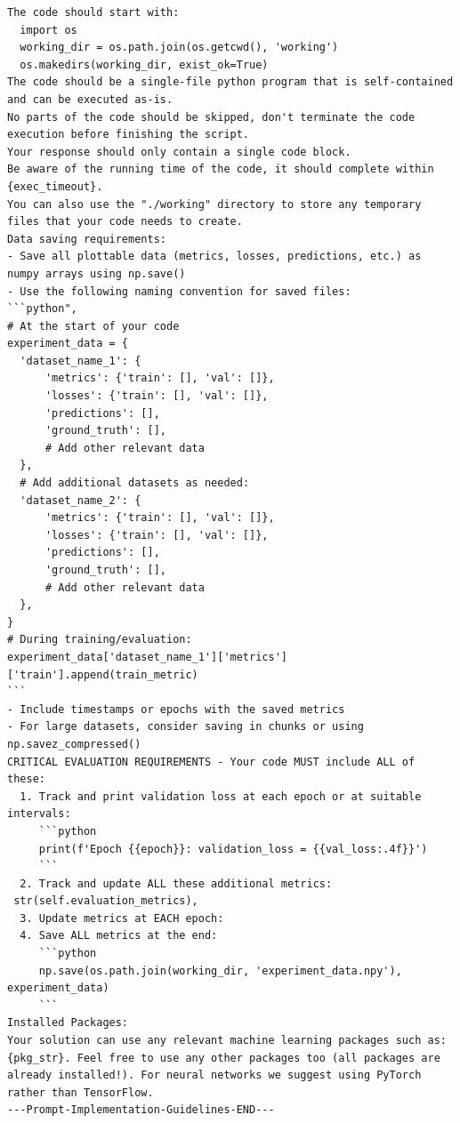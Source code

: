 \begin{appendices}
\begin{tcolorbox}[breakable, colback=orange!5!white, colframe=orange!80!black, title=Initial Experiment Implementation Prompt]
\begin{Verbatim}[breaklines, breaksymbol={}, breaksymbolleft={}, fontsize=\small]
The code should start with:
  import os
  working_dir = os.path.join(os.getcwd(), 'working')
  os.makedirs(working_dir, exist_ok=True)
The code should be a single-file python program that is self-contained and can be executed as-is.
No parts of the code should be skipped, don't terminate the code execution before finishing the script.
Your response should only contain a single code block.
Be aware of the running time of the code, it should complete within {exec_timeout}.
You can also use the "./working" directory to store any temporary files that your code needs to create.
Data saving requirements:
- Save all plottable data (metrics, losses, predictions, etc.) as numpy arrays using np.save()
- Use the following naming convention for saved files:
```python",
# At the start of your code
experiment_data = {
  'dataset_name_1': {
      'metrics': {'train': [], 'val': []},
      'losses': {'train': [], 'val': []},
      'predictions': [],
      'ground_truth': [],
      # Add other relevant data
  },
  # Add additional datasets as needed:
  'dataset_name_2': {
      'metrics': {'train': [], 'val': []},
      'losses': {'train': [], 'val': []},
      'predictions': [],
      'ground_truth': [],
      # Add other relevant data
  },
}
# During training/evaluation:
experiment_data['dataset_name_1']['metrics']['train'].append(train_metric)
```
- Include timestamps or epochs with the saved metrics
- For large datasets, consider saving in chunks or using np.savez_compressed()
CRITICAL EVALUATION REQUIREMENTS - Your code MUST include ALL of these:
  1. Track and print validation loss at each epoch or at suitable intervals:
     ```python
     print(f'Epoch {{epoch}}: validation_loss = {{val_loss:.4f}}')
     ```
  2. Track and update ALL these additional metrics:
 str(self.evaluation_metrics),
  3. Update metrics at EACH epoch:
  4. Save ALL metrics at the end:
     ```python
     np.save(os.path.join(working_dir, 'experiment_data.npy'), experiment_data)
     ```
Installed Packages:
Your solution can use any relevant machine learning packages such as: {pkg_str}. Feel free to use any other packages too (all packages are already installed!). For neural networks we suggest using PyTorch rather than TensorFlow.
---Prompt-Implementation-Guidelines-END---
\end{Verbatim}
\end{tcolorbox}


\end{appendices}
